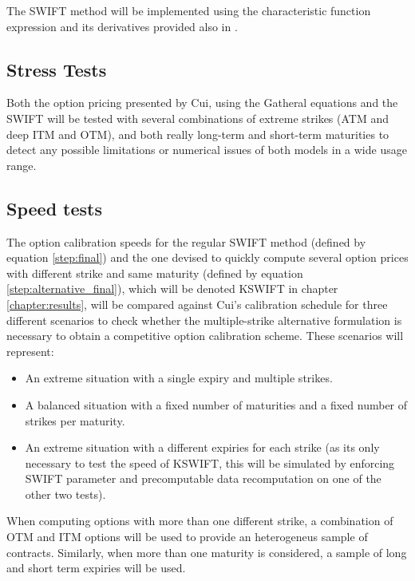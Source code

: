 \documentclass[12,twoside]{mammeTFM}
\theoremstyle{definition}
\theoremstyle{remark}
\begin{document}
The SWIFT method will be implemented using the characteristic function expression and its derivatives provided also in \cite{cui17}.

\subsection{Stress Tests}
Both the option pricing presented by Cui, using the Gatheral equations \cite{cui17} and the SWIFT will be tested with several combinations of extreme strikes (ATM and deep ITM and OTM), and both really long-term and short-term maturities to detect any possible limitations or numerical issues of both models in a wide usage range.

\subsection{Speed tests}
The option calibration speeds for the regular SWIFT method (defined by equation \ref{step:final}) and the one devised to quickly compute several option prices with different strike and same maturity (defined by equation \ref{step:alternative_final}), which will be denoted KSWIFT in chapter \ref{chapter:results}, will be compared against Cui's calibration schedule for three different scenarios to check whether the multiple-strike alternative formulation is necessary to obtain a competitive option calibration scheme. These scenarios will represent:
\begin{itemize}
\item An extreme situation with a single expiry and multiple strikes.
\item A balanced situation with a fixed number of maturities and a fixed number of strikes per maturity.
\item An extreme situation with a different expiries for each strike (as its only necessary to test the speed of KSWIFT, this will be simulated by enforcing SWIFT parameter and precomputable data recomputation on one of the other two tests).
\end{itemize}

When computing options with more than one different strike, a combination of OTM and ITM options will be used to provide an heterogeneus sample of contracts. Similarly, when more than one maturity is considered, a sample of long and short term expiries will be used.

\end{document}
